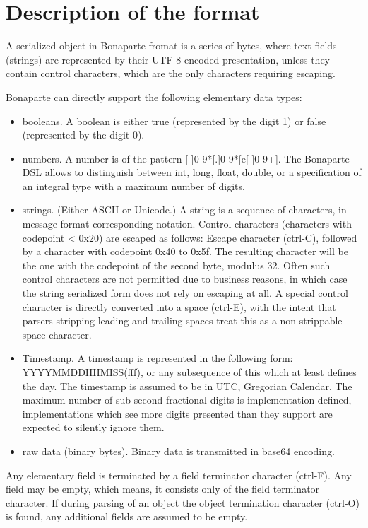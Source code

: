 \documentclass[11pt,a4paper,oneside]{article}
\begin{document}
\section{Description of the format}
A serialized object in Bonaparte fromat is a series of bytes, where text fields
(strings) are represented by their UTF-8 encoded presentation, unless they
contain control characters, which are the only characters requiring escaping.

Bonaparte can directly support the following elementary data types:
\begin{itemize}
\item booleans. A boolean is either true (represented by the digit 1) or false (represented by the digit 0).
\item numbers. A number is of the pattern [-]{0-9}*[.]{0-9}*[e[-]{0-9}+].
The Bonaparte DSL allows to distinguish between int, long, float, double, or a
specification of an integral type with a maximum number of digits.
\item strings. (Either ASCII or Unicode.) A string is a sequence of characters,
in message format corresponding notation. Control characters (characters with
codepoint < 0x20) are escaped as follows: Escape character (ctrl-C), followed by
a character with codepoint 0x40 to 0x5f. The resulting character will be the one
with the codepoint of the second byte, modulus 32. Often such control characters
are not permitted due to business reasons, in which case the string serialized
form does not rely on escaping at all. A special control character is directly
converted into a space (ctrl-E), with the intent that parsers stripping leading
and trailing spaces treat this as a non-strippable space character.
\item Timestamp. A timestamp is represented in the following form:
YYYYMMDDHHMISS(fff), or any subsequence of this which at least defines the
day. The timestamp is assumed to be in UTC, Gregorian Calendar. The maximum
number of sub-second fractional digits is implementation defined,
implementations which see more digits presented than they support are expected to silently ignore them.
\item raw data (binary bytes). Binary data is transmitted in base64 encoding.
\end{itemize}
Any elementary field is terminated by a field terminator character (ctrl-F). Any
field may be empty, which means, it consists only of the field terminator
character. If during parsing of an object the object termination character
(ctrl-O) is found, any additional fields are assumed to be empty.
\end{document}

